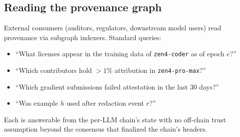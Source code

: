 \subsection{Reading the provenance graph}

External consumers (auditors, regulators, downstream model users) read provenance via subgraph indexers. Standard queries:
\begin{itemize}[nosep]
\item ``What licenses appear in the training data of \texttt{zen4-coder} as of epoch $e$?''
\item ``Which contributors hold $>1\%$ attribution in \texttt{zen4-pro-max}?''
\item ``Which gradient submissions failed \TEE{} attestation in the last 30 days?''
\item ``Was example $h$ used after redaction event $r$?''
\end{itemize}

Each is answerable from the per-LLM chain's state with no off-chain trust assumption beyond the \Quasar{} consensus that finalized the chain's headers.
